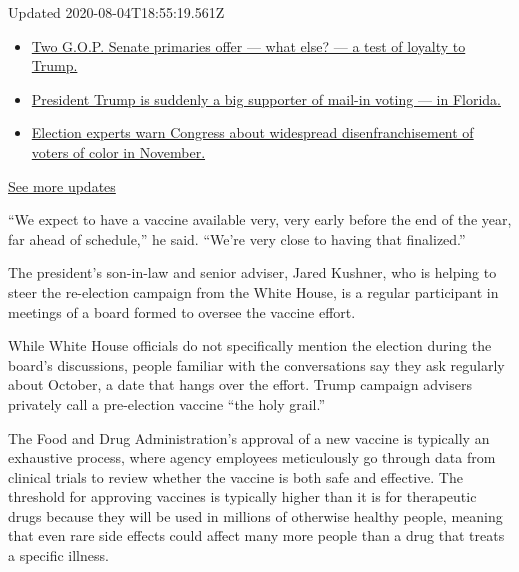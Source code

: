 Updated 2020-08-04T18:55:19.561Z

\begin{itemize}
\tightlist
\item
  \href{https://www.nytimes.com/2020/08/04/us/elections/primary-election-michigan-arizona-kansas.html?action=click\&pgtype=Article\&state=default\&region=MAIN_CONTENT_1\&context=storylines_live_updates\#link-3924dd44}{Two
  G.O.P. Senate primaries offer --- what else? --- a test of loyalty to
  Trump.}
\item
  \href{https://www.nytimes.com/2020/08/04/us/elections/primary-election-michigan-arizona-kansas.html?action=click\&pgtype=Article\&state=default\&region=MAIN_CONTENT_1\&context=storylines_live_updates\#link-32b39e33}{President
  Trump is suddenly a big supporter of mail-in voting --- in Florida.}
\item
  \href{https://www.nytimes.com/2020/08/04/us/elections/primary-election-michigan-arizona-kansas.html?action=click\&pgtype=Article\&state=default\&region=MAIN_CONTENT_1\&context=storylines_live_updates\#link-6d019753}{Election
  experts warn Congress about widespread disenfranchisement of voters of
  color in November.}
\end{itemize}

\href{https://www.nytimes.com/2020/08/04/us/elections/primary-election-michigan-arizona-kansas.html?action=click\&pgtype=Article\&state=default\&region=MAIN_CONTENT_1\&context=storylines_live_updates}{See
more updates}

``We expect to have a vaccine available very, very early before the end
of the year, far ahead of schedule,'' he said. ``We're very close to
having that finalized.''

The president's son-in-law and senior adviser, Jared Kushner, who is
helping to steer the re-election campaign from the White House, is a
regular participant in meetings of a board formed to oversee the vaccine
effort.

While White House officials do not specifically mention the election
during the board's discussions, people familiar with the conversations
say they ask regularly about October, a date that hangs over the effort.
Trump campaign advisers privately call a pre-election vaccine ``the holy
grail.''

The Food and Drug Administration's approval of a new vaccine is
typically an exhaustive process, where agency employees meticulously go
through data from clinical trials to review whether the vaccine is both
safe and effective. The threshold for approving vaccines is typically
higher than it is for therapeutic drugs because they will be used in
millions of otherwise healthy people, meaning that even rare side
effects could affect many more people than a drug that treats a specific
illness.

